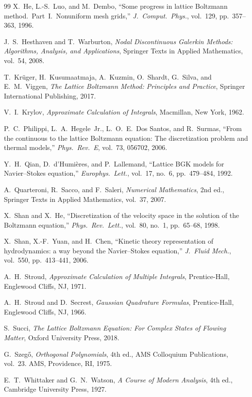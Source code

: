 \documentclass[11pt,a4paper]{article}
\theoremstyle{definition}
\begin{document}
\begin{thebibliography}{99}
X.~He, L.-S.~Luo, and M.~Dembo,
``Some progress in lattice Boltzmann method.~Part~I.~Nonuniform mesh grids,''
\emph{J.\ Comput.\ Phys.}, vol.~129, pp.~357--363, 1996.

J.~S.~Hesthaven and T.~Warburton,
\emph{Nodal Discontinuous Galerkin Methods: Algorithms, Analysis, and
Applications},
Springer Texts in Applied Mathematics, vol.~54, 2008.

T.~Krüger, H.~Kusumaatmaja, A.~Kuzmin, O.~Shardt, G.~Silva, and
E.~M.~Viggen,
\emph{The Lattice Boltzmann Method: Principles and Practice},
Springer International Publishing, 2017.

V.~I.~Krylov,
\emph{Approximate Calculation of Integrals},
Macmillan, New York, 1962.

P.~C.~Philippi, L.~A.~Hegele~Jr., L.~O.~E.~Dos Santos, and R.~Surmas,
``From the continuous to the lattice Boltzmann equation:
The discretization problem and thermal models,''
\emph{Phys.\ Rev.\ E}, vol.~73, 056702, 2006.

Y.~H.~Qian, D.~d'Humières, and P.~Lallemand,
``Lattice BGK models for Navier--Stokes equation,''
\emph{Europhys.\ Lett.}, vol.~17, no.~6, pp.~479--484, 1992.

A.~Quarteroni, R.~Sacco, and F.~Saleri,
\emph{Numerical Mathematics}, 2nd ed.,
Springer Texts in Applied Mathematics, vol.~37, 2007.

X.~Shan and X.~He,
``Discretization of the velocity space in the solution of the Boltzmann
equation,''
\emph{Phys.\ Rev.\ Lett.}, vol.~80, no.~1, pp.~65--68, 1998.

X.~Shan, X.-F.~Yuan, and H.~Chen,
``Kinetic theory representation of hydrodynamics: a way beyond the
Navier--Stokes equation,''
\emph{J.~Fluid Mech.}, vol.~550, pp.~413--441, 2006.

A.~H.~Stroud,
\emph{Approximate Calculation of Multiple Integrals},
Prentice-Hall, Englewood Cliffs, NJ, 1971.

A.~H.~Stroud and D.~Secrest,
\emph{Gaussian Quadrature Formulas},
Prentice-Hall, Englewood Cliffs, NJ, 1966.

S.~Succi,
\emph{The Lattice Boltzmann Equation: For Complex States of Flowing Matter},
Oxford University Press, 2018.

G.~Szegő,
\emph{Orthogonal Polynomials}, 4th ed.,
AMS Colloquium Publications, vol.~23. AMS, Providence, RI, 1975.

E.~T.~Whittaker and G.~N.~Watson,
\emph{A Course of Modern Analysis}, 4th ed.,
Cambridge University Press, 1927.

\end{thebibliography}
\end{document}
